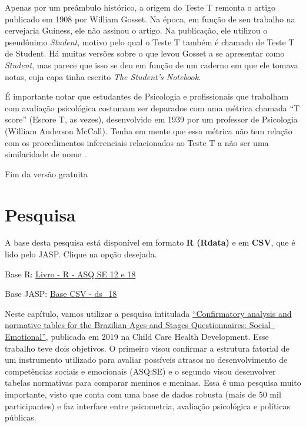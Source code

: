 \documentclass[
]{book}
\newenvironment{base}{
  \definecolor{shadecolor}{rgb}{0.764,0.992,0.686}  %
  \color{black}
  \begin{shaded}}
 {\end{shaded}}
\begin{document}
Apenas por um preâmbulo histórico, a origem do Teste T remonta o artigo publicado em 1908 por William Gosset. Na época, em função de seu trabalho na cervejaria Guiness, ele não assinou o artigo. Na publicação, ele utilizou o pseudônimo \emph{Student}, motivo pelo qual o Teste T também é chamado de Teste T de Student. Há muitas versões sobre o que levou Gosset a se apresentar como \emph{Student}, mas parece que isso se deu em função de um caderno em que ele tomava notas, cuja capa tinha escrito \emph{The Student's Notebook}.

É importante notar que estudantes de Psicologia e profissionais que trabalham com avaliação psicológica costumam ser deparados com uma métrica chamada ``T score'' (Escore T, as vezes), desenvolvido em 1939 por um professor de Psicologia (William Anderson McCall). Tenha em mente que essa métrica não tem relação com os procedimentos inferenciais relacionados ao Teste T a não ser uma similaridade de nome \citep{Krus1977}.

Fim da versão gratuita

\hypertarget{pesquisa-3}{%
\section{Pesquisa}\label{pesquisa-3}}

\begin{base}
A base desta pesquisa está disponível em formato \textbf{R (Rdata)} e em \textbf{CSV}, que é lido pelo JASP. Clique na opção desejada.

Base R: \href{https://github.com/anovabr/mqt/raw/master/bases/Livro\%20-\%20R\%20-\%20ASQ\%20SE\%2012\%20e\%2018.RData}{Livro - R - ASQ SE 12 e 18}

Base JASP: \href{https://github.com/anovabr/mqt/raw/master/bases/bases_csv_jasp.zip}{Base CSV - ds\_18}

\end{base}

Neste capítulo, vamos utilizar a pesquisa intitulada \href{https://onlinelibrary.wiley.com/doi/abs/10.1111/cch.12649}{``Confirmatory analysis and normative tables for the Brazilian Ages and Stages Questionnaires: Social--Emotional''}, publicada em 2019 na Child Care Health Development. Esse trabalho teve dois objetivos. O primeiro visou confirmar a estrutura fatorial de um instrumento utilizado para avaliar possíveis atrasos no desenvolvimento de competências sociais e emocionais (ASQ:SE) e o segundo visou desenvolver tabelas normativas para comparar meninos e meninas. Essa é uma pesquisa muito importante, visto que conta com uma base de dados robusta (mais de 50 mil participantes) e faz interface entre psicometria, avaliação psicológica e políticas públicas.
\end{document}

